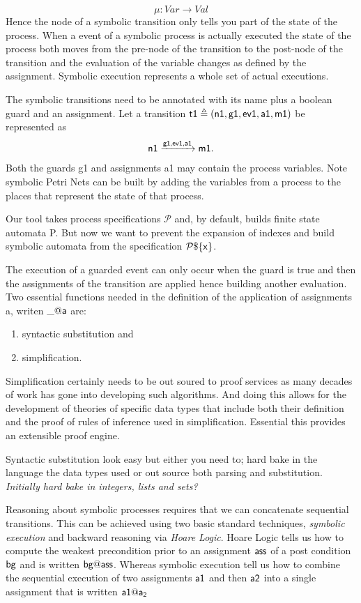 \documentclass[]{article}
\begin{document}
\[\mu: Var \rightarrow Val\]
Hence the node of a symbolic transition only tells you part of the state of the process. When a event of a symbolic process is actually executed the state of the process both moves from the pre-node of the transition to the post-node of the transition and the evaluation of the variable changes as defined by the assignment.  Symbolic execution represents a whole set of actual executions.

The symbolic  transitions need  to be annotated  with its name plus a boolean guard and an assignment. Let a transition  ${\sf t1 \triangleq (n1,g1,ev1,a1,m1)}$  be represented as
\[{\sf n1\xrightarrow{\text{\sf g1,ev1,a1}} m1}.\]
Both the guards {\sf g1} and assignments {\sf a1} may contain the process variables.  Note symbolic Petri Nets can be built by adding the variables from a process to the places that represent the state of that process.

Our tool takes process specifications $\mathcal{P}$ and,  by default, builds finite state automata {\sf P}. But now we want to prevent the expansion of indexes and build symbolic automata  from the specification ${\sf \mathcal{P}\$\{x\}}$.

The execution of a guarded  event  can only occur when the guard is true  and then the assignments of the transition are applied hence building another evaluation. Two  essential functions needed in the definition of the application of assignments {\sf a}, writen  $\_@{\sf a}$ are:
\begin{enumerate}
\item syntactic substitution and
\item simplification.
\end{enumerate}

Simplification certainly needs to be out soured to proof services as  many decades of work has gone into developing such algorithms. And doing this allows for the development of theories of specific data types that include both their definition and the proof of rules of inference used in simplification. Essential this provides an extensible proof engine.

Syntactic substitution look easy but  either you need to; hard bake in the language the data types used or out source both  parsing and substitution. \emph{Initially hard bake in integers, lists and sets?}

Reasoning about symbolic processes requires that we can concatenate sequential transitions. This can be achieved using  two basic standard techniques, \emph{symbolic execution} and backward reasoning via \emph{Hoare Logic}. Hoare Logic tells us how to compute the weakest precondition prior to an assignment ${\sf ass}$ of  a post condition ${\sf bg}$ and is written  ${\sf bg@ass}$.  Whereas symbolic execution tell us how to combine the sequential execution of two assignments ${\sf a1}$ and then ${\sf a2}$ into a single assignment that is written ${\sf a1@a_2}$
\end{document}
